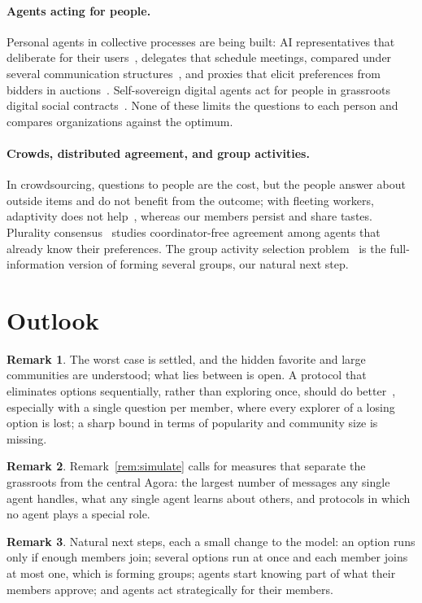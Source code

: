 \documentclass[11pt]{article}
\theoremstyle{definition}
\newtheorem{remark}{Remark}
\begin{document}
\paragraph{Agents acting for people.}
Personal agents in collective processes are being built: AI representatives that deliberate for their users~\cite{low2026habermolt}, delegates that schedule meetings, compared under several communication structures~\cite{zou2026calbench}, and proxies that elicit preferences from bidders in auctions~\cite{huang2025accelerated}.
Self-sovereign digital agents act for people in grassroots digital social contracts~\cite{poupko2022ssda}.
None of these limits the questions to each person and compares organizations against the optimum.

\paragraph{Crowds, distributed agreement, and group activities.}
In crowdsourcing, questions to people are the cost, but the people answer about outside items and do not benefit from the outcome; with fleeting workers, adaptivity does not help~\cite{karger2014budget}, whereas our members persist and share tastes.
Plurality consensus~\cite{becchetti2015plurality} studies coordinator-free agreement among agents that already know their preferences.
The group activity selection problem~\cite{darmann2018gasp} is the full-information version of forming several groups, our natural next step.

\section{Outlook}

\begin{remark}
The worst case is settled, and the hidden favorite and large communities are understood; what lies between is open.
A protocol that eliminates options sequentially, rather than exploring once, should do better~\cite{garivier2016etc,karnin2013almost}, especially with a single question per member, where every explorer of a losing option is lost; a sharp bound in terms of popularity and community size is missing.
\end{remark}

\begin{remark}
Remark~\ref{rem:simulate} calls for measures that separate the grassroots from the central Agora: the largest number of messages any single agent handles, what any single agent learns about others, and protocols in which no agent plays a special role.
\end{remark}

\begin{remark}
Natural next steps, each a small change to the model: an option runs only if enough members join; several options run at once and each member joins at most one, which is forming groups; agents start knowing part of what their members approve; and agents act strategically for their members.
\end{remark}



\end{document}
